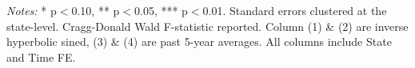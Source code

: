 \begin{table}[htbp] \centering
\caption{Inverse Hyperbolic Sine Effects on Business Dynamics}
\label{tab:sin_iv}
\newsavebox{\boxsine} \newlength{\tablesine}
\settowidth{\tablesine}{\usebox{\boxsine}}
\usebox{\boxsine} \vspace{0.5em} 
\parbox{\tablesine}{\footnotesize \textit{Notes:} * p$<$0.10, ** p$<$0.05, *** p$<$0.01. Standard errors clustered at the state-level. Cragg-Donald Wald F-statistic reported. Column (1) \& (2) are inverse hyperbolic sined, (3) \& (4) are past 5-year averages. All columns include State and Time FE.}
 \end{table}
